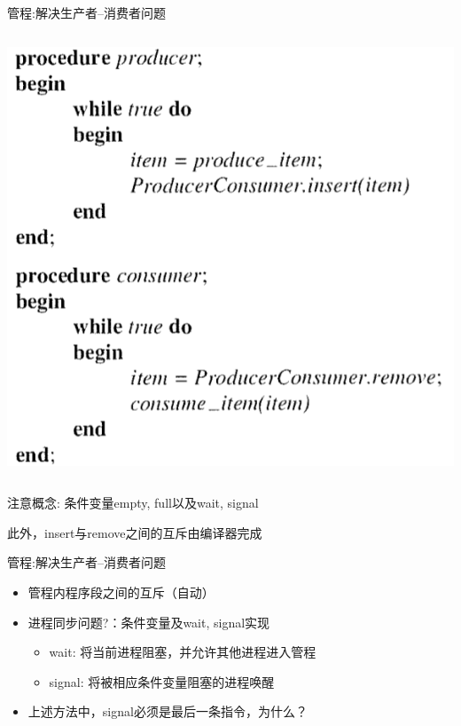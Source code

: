 \documentclass[xcolor=svgnames]{beamer}
\begin{document}
\begin{CJK*}{UTF8}{gbsn}
\begin{frame}{管程:解决生产者--消费者问题}
\begin{columns}[b]
\includegraphics[width=1.0\textwidth]{mon2.png}
\end{columns}%

\alert{注意概念:} 条件变量empty, full以及wait, signal

此外，insert与remove之间的互斥由编译器完成
\end{frame}

\begin{frame}{管程:解决生产者--消费者问题}
\begin{itemize}
\item 管程内程序段之间的互斥（自动）
\item 进程同步问题?：条件变量及wait, signal实现
\begin{itemize}
\item wait: 将当前进程阻塞，并允许其他进程进入管程
\item signal: 将被相应条件变量阻塞的进程唤醒
\end{itemize}
\item 上述方法中，signal必须是最后一条指令，为什么？ 
\end{itemize}
\end{frame}


\end{CJK*}
\end{document}
